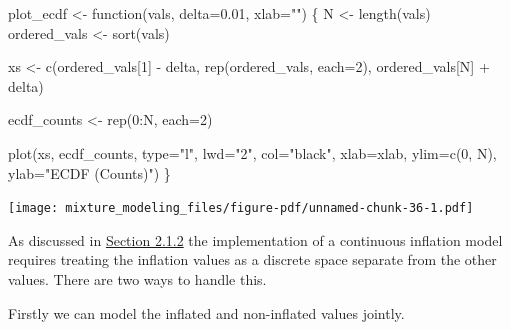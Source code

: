 \documentclass[
  letterpaper,
  DIV=11,
  numbers=noendperiod]{scrartcl}
\newenvironment{Shaded}{\begin{snugshade}}{\end{snugshade}}
\newcommand{\AttributeTok}[1]{\textcolor[rgb]{0.40,0.45,0.13}{#1}}
\newcommand{\ControlFlowTok}[1]{\textcolor[rgb]{0.00,0.23,0.31}{#1}}
\newcommand{\DecValTok}[1]{\textcolor[rgb]{0.68,0.00,0.00}{#1}}
\newcommand{\FloatTok}[1]{\textcolor[rgb]{0.68,0.00,0.00}{#1}}
\newcommand{\FunctionTok}[1]{\textcolor[rgb]{0.28,0.35,0.67}{#1}}
\newcommand{\NormalTok}[1]{\textcolor[rgb]{0.00,0.23,0.31}{#1}}
\newcommand{\OtherTok}[1]{\textcolor[rgb]{0.00,0.23,0.31}{#1}}
\newcommand{\SpecialCharTok}[1]{\textcolor[rgb]{0.37,0.37,0.37}{#1}}
\newcommand{\StringTok}[1]{\textcolor[rgb]{0.13,0.47,0.30}{#1}}
\begin{document}
\begin{Shaded}
\begin{Highlighting}[]
\NormalTok{plot\_ecdf }\OtherTok{\textless{}{-}} \ControlFlowTok{function}\NormalTok{(vals, }\AttributeTok{delta=}\FloatTok{0.01}\NormalTok{, }\AttributeTok{xlab=}\StringTok{""}\NormalTok{) \{}
\NormalTok{  N }\OtherTok{\textless{}{-}} \FunctionTok{length}\NormalTok{(vals)}
\NormalTok{  ordered\_vals }\OtherTok{\textless{}{-}} \FunctionTok{sort}\NormalTok{(vals)}

\NormalTok{  xs }\OtherTok{\textless{}{-}} \FunctionTok{c}\NormalTok{(ordered\_vals[}\DecValTok{1}\NormalTok{] }\SpecialCharTok{{-}}\NormalTok{ delta,}
          \FunctionTok{rep}\NormalTok{(ordered\_vals, }\AttributeTok{each=}\DecValTok{2}\NormalTok{),}
\NormalTok{          ordered\_vals[N] }\SpecialCharTok{+}\NormalTok{ delta)}

\NormalTok{  ecdf\_counts }\OtherTok{\textless{}{-}} \FunctionTok{rep}\NormalTok{(}\DecValTok{0}\SpecialCharTok{:}\NormalTok{N, }\AttributeTok{each=}\DecValTok{2}\NormalTok{)}

  \FunctionTok{plot}\NormalTok{(xs, ecdf\_counts, }\AttributeTok{type=}\StringTok{"l"}\NormalTok{, }\AttributeTok{lwd=}\StringTok{"2"}\NormalTok{, }\AttributeTok{col=}\StringTok{"black"}\NormalTok{,}
       \AttributeTok{xlab=}\NormalTok{xlab,}
       \AttributeTok{ylim=}\FunctionTok{c}\NormalTok{(}\DecValTok{0}\NormalTok{, N), }\AttributeTok{ylab=}\StringTok{"ECDF (Counts)"}\NormalTok{)}
\NormalTok{\}}
\end{Highlighting}
\end{Shaded}

\begin{Shaded}
\end{Shaded}

\texttt{[image: mixture\_modeling\_files/figure-pdf/unnamed-chunk-36-1.pdf]}

As discussed in \hyperref[sec:cont_infl]{Section 2.1.2} the
implementation of a continuous inflation model requires treating the
inflation values as a discrete space separate from the other values.
There are two ways to handle this.

Firstly we can model the inflated and non-inflated values jointly.
\end{document}
